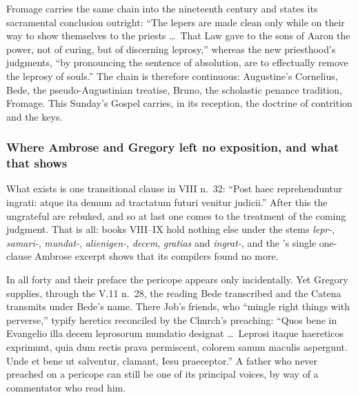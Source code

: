 Fromage carries the same chain into the nineteenth century and states its
sacramental conclusion outright: ``The lepers are made clean only while on
their way to show themselves to the priests \dots\ That Law gave to the sons of
Aaron the power, not of curing, but of discerning leprosy,'' whereas the new
priesthood's judgments, ``by pronouncing the sentence of absolution, are to
effectually remove the leprosy of souls.'' The chain is therefore
continuous: Augustine's Cornelius, Bede, the pseudo-Augustinian treatise,
Bruno, the scholastic penance tradition, Fromage. This Sunday's Gospel
carries, in its reception, the doctrine of contrition and the keys.

\subsubsection*{Where Ambrose and Gregory left no exposition, and what that shows}

\begin{witnessnote}
What exists is one transitional clause in  VIII n.~32: ``Post haec reprehenduntur ingrati: atque ita demum ad
tractatum futuri venitur judicii.'' After this the ungrateful are rebuked, and
so at last one comes to the treatment of the coming judgment. That is all:
books VIII--IX hold nothing else under the stems \textit{lepr-},
\textit{samari-}, \textit{mundat-}, \textit{alienigen-}, \textit{decem},
\textit{gratias} and \textit{ingrat-}, and the 's single
one-clause Ambrose excerpt shows that its compilers found no more.
\end{witnessnote}

\begin{witnessnote}
In all forty  and their preface the pericope
appears only incidentally. Yet Gregory supplies, through the  V.11 n.~28, the reading Bede transcribed and the Catena transmits under
Bede's name. There Job's friends, who ``mingle right things with perverse,''
typify heretics reconciled by the Church's preaching: ``Quos bene in Evangelio
illa decem leprosorum mundatio designat \dots\ Leprosi itaque haereticos
exprimunt, quia dum rectis prava permiscent, colorem sanum maculis
aspergunt. Unde et bene ut salventur, clamant, Iesu praeceptor.'' A father who
never preached on a pericope can still be one of its principal voices, by way
of a commentator who read him.
\end{witnessnote}

